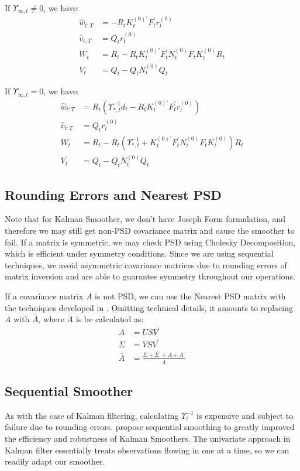 \documentclass[12pt]{article}
\numberwithin{equation}{section}
\begin{document}
If $\Upsilon_{\infty,t} \neq 0$, we have:
\begin{align}
    \hat{w}_{t:T} &= -R_tK_t^{(0)'}F_t^{'}r_t^{(0)} \\
    \hat{v}_{t:T} &= Q_tr_t^{(0)} \\
    W_t &= R_t - R_tK_t^{(0)'}F_t^{'}N_t^{(0)}F_tK_t^{(0)}R_t \\
    V_t &= Q_t - Q_tN_t^{(0)}Q_t
\end{align}

If $\Upsilon_{\infty,t} = 0$, we have:
\begin{align}
    \hat{w}_{t:T} &= R_t(\Upsilon_{*,t}^{-1}d_t - R_tK_t^{(0)'}F_t^{'}r_t^{(0)}) \\
    \hat{v}_{t:T} &= Q_tr_t^{(0)} \\
    W_t &= R_t - R_t(\Upsilon_{*,t}^{-1} + K_t^{(0)'}F_t^{'}N_t^{(0)}F_tK_t^{(0)})R_t \\
    V_t &= Q_t - Q_tN_t^{(0)}Q_t
\end{align}

\subsection{Rounding Errors and Nearest PSD}
Note that for Kalman Smoother, we don't have Joseph Form formulation, and therefore we may still get non-PSD covariance matrix and cause the smoother to fail. If a matrix is symmetric, we may check PSD using Cholesky Decomposition, which is efficient under symmetry conditions. Since we are using sequential techniques, we avoid asymmetric covariance matrices due to rounding errors of matrix inversion and are able to guarantee symmetry throughout our operations. 

If a covariance matrix $A$ is not PSD, we can use the Nearest PSD matrix with the techniques developed in \cite{higham_1988}. Omitting technical details, it amounts to replacing $A$ with $\bar{A}$, where $\bar{A}$ is be calculated as:
\begin{align*}
    A &= USV^{'} \\
    \Sigma &= VSV^{'} \\
    \bar{A} &= \frac{\Sigma + \Sigma^{'} + A + A^{'}}{4}
\end{align*}

\subsection{Sequential Smoother}
As with the case of Kalman filtering, calculating $\Upsilon_t^{-1}$ is expensive and subject to failure due to rounding errors. \cite{durbin_koopman_2000} propose sequential smoothing to greatly improved the efficiency and robustness of Kalman Smoothers. The univariate approach in Kalman filter essentially treats observations flowing in one at a time, so we can readily adapt our smoother.
\end{document}

